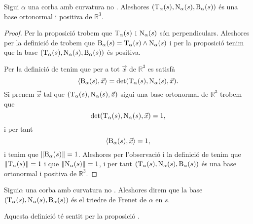 \documentclass[../../Main.tex]{subfiles}
\begin{document}
	\begin{proposition}
		\label{prop:triedre de Frenet}
		Sigui \(\alpha\) una corba amb curvatura no \nulla{}. Aleshores \((\operatorname{T}_{\alpha}(s),\operatorname{N}_{\alpha}(s),\operatorname{B}_{\alpha}(s))\) és una base ortonormal i positiva de \(\mathbb{R}^{3}\).
		\begin{proof}
			Per la proposició  trobem que \(\operatorname{T}_{\alpha}(s)\) i \(\operatorname{N}_{\alpha}(s)\) són perpendiculars. Aleshores per la definició de  trobem que \(\operatorname{B}_{\alpha}(s)=\operatorname{T}_{\alpha}(s)\mathbin{\wedge}\operatorname{N}_{\alpha}(s)\) i per la proposició  tenim que la base \((\operatorname{T}_{\alpha}(s),\operatorname{N}_{\alpha}(s),\operatorname{B}_{\alpha}(s))\) és positiva.
			
			Per la definició de  tenim que per a tot \(\vec{x}\) de \(\mathbb{R}^{3}\) es satisfà
			\[
			    \prodesc{\binormal_{\alpha}(s)}{\vec{x}}=\det(\tangent_{\alpha}(s),\normal_{\alpha}(s),\vec{x}).
			\]
			Si prenem \(\vec{x}\) tal que \((\operatorname{T}_{\alpha}(s),\operatorname{N}_{\alpha}(s),\vec{x})\) sigui una base ortonormal de \(\mathbb{R}^{3}\) trobem que
			\[
			    \det(\operatorname{T}_{\alpha}(s),\operatorname{N}_{\alpha}(s),\vec{x})=1,
			\]
			i per tant
			\[
			    \prodesc{\binormal_{\alpha}(s)}{\vec{x}}=1,
			\]
			i tenim que \(\norm{\binormal_{\alpha}(s)}=1\). Aleshores per l'observació  i la definició de  tenim que \(\norm{\tangent_{\alpha}(s)}=1\) i que \(\norm{\normal_{\alpha}(s)}=1\), i per tant \((\operatorname{T}_{\alpha}(s),\operatorname{N}_{\alpha}(s),\operatorname{B}_{\alpha}(s))\) és una base ortonormal i positiva de \(\mathbb{R}^{3}\). %
		\end{proof}
	\end{proposition}
	\begin{definition}
		\label{def:triedre de Frenet}
		Sigui\(\alpha\) una corba amb curvatura no \nulla{}. Aleshores direm que la base \((\operatorname{T}_{\alpha}(s),\operatorname{N}_{\alpha}(s),\operatorname{B}_{\alpha}(s))\) és el triedre de Frenet de \(\alpha\) en \(s\).
		
		Aquesta definició té sentit per la proposició .
	\end{definition}
\end{document}
